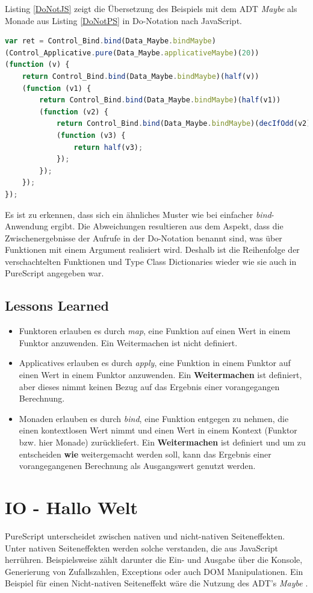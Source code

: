 \documentclass[
12pt,
ngerman,
oneside]
{scrbook} %
\begin{document}
Listing \ref{DoNotJS} zeigt die Übersetzung des Beispiels mit dem ADT \emph{Maybe} als Monade aus Listing \ref{DoNotPS} in Do-Notation nach JavaScript.

\begin{lstlisting}[language=javascript, style=numbered-and-boxed, caption=Übersetzung von Monaden mit Maybe nach JS in Do-Notation, label=DoNotJS]
var ret = Control_Bind.bind(Data_Maybe.bindMaybe)
(Control_Applicative.pure(Data_Maybe.applicativeMaybe)(20))
(function (v) {
	return Control_Bind.bind(Data_Maybe.bindMaybe)(half(v))
	(function (v1) {
		return Control_Bind.bind(Data_Maybe.bindMaybe)(half(v1))
		(function (v2) {
			return Control_Bind.bind(Data_Maybe.bindMaybe)(decIfOdd(v2))
			(function (v3) {
				return half(v3);
			});
		});
	});
});
\end{lstlisting}

Es ist zu erkennen, dass sich ein ähnliches Muster wie bei einfacher \emph{bind}-Anwendung ergibt. Die Abweichungen resultieren aus dem Aspekt, dass die Zwischenergebnisse der Aufrufe in der Do-Notation benannt sind, was über Funktionen mit einem Argument realisiert wird. Deshalb ist die Reihenfolge der verschachtelten Funktionen und Type Class Dictionaries wieder wie sie auch in PureScript angegeben war.

\section{Lessons Learned}

\begin{itemize}
	\item Funktoren erlauben es durch \emph{map}, eine Funktion auf einen Wert in einem Funktor anzuwenden. Ein Weitermachen ist nicht definiert.
	\item Applicatives erlauben es durch \emph{apply}, eine Funktion in einem Funktor auf einen Wert in einem Funktor anzuwenden. Ein \textbf{Weitermachen} ist definiert, aber dieses nimmt keinen Bezug auf das Ergebnis einer vorangegangen Berechnung.
	\item Monaden erlauben es durch \emph{bind}, eine Funktion entgegen zu nehmen, die einen kontextlosen Wert nimmt und einen Wert in einem Kontext (Funktor bzw. hier Monade) zurückliefert. Ein \textbf{Weitermachen} ist definiert und um zu entscheiden \textbf{wie} weitergemacht werden soll, kann das Ergebnis einer vorangegangenen Berechnung als Ausgangswert genutzt werden.
\end{itemize}


\chapter{IO - Hallo Welt}
PureScript unterscheidet zwischen nativen und nicht-nativen Seiteneffekten. Unter nativen Seiteneffekten werden solche verstanden, die aus JavaScript herrühren. Beispielsweise zählt darunter die Ein- und Ausgabe über die Konsole, Generierung von Zufallszahlen, Exceptions oder auch DOM Manipulationen. Ein Beispiel für einen Nicht-nativen Seiteneffekt wäre die Nutzung des ADT's \emph{Maybe} \cite[][S. 107--108]{Freeman17}.	
\end{document}
